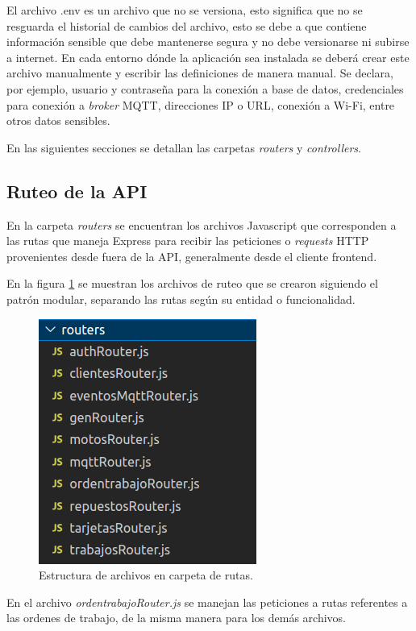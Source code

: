 El archivo .env es un archivo que no se versiona, esto significa que no se resguarda el historial de cambios del archivo, esto se debe a que contiene información sensible que debe mantenerse segura y no debe versionarse ni subirse a internet. En cada entorno dónde la aplicación sea instalada se deberá crear este archivo manualmente y escribir las definiciones de manera manual. Se declara, por ejemplo, usuario y contraseña para la conexión a base de datos, credenciales para conexión a \textit{broker} MQTT, direcciones IP o URL, conexión a Wi-Fi, entre otros datos sensibles.

En las siguientes secciones se detallan las carpetas \textit{routers} y \textit{controllers}.

\subsection{Ruteo de la API}
\label{subsec:apirouters}

En la carpeta \textit{routers} se encuentran los archivos Javascript que corresponden a las rutas que maneja Express para recibir las peticiones o \textit{requests} HTTP provenientes desde fuera de la API, generalmente desde el cliente frontend.

En la figura \ref{fig:apiroutes} se muestran los archivos de ruteo que se crearon siguiendo el patrón modular, separando las rutas según su entidad o funcionalidad.

\begin{figure}[ht]
	\centering
	\includegraphics[scale=.50]{./Figures/api-routes.png}
	\caption{Estructura de archivos en carpeta de rutas.}
	\label{fig:apiroutes}
\end{figure}

En el archivo \textit{ordentrabajoRouter.js} se manejan las peticiones a rutas referentes a las ordenes de trabajo, de la misma manera para los demás archivos. 

